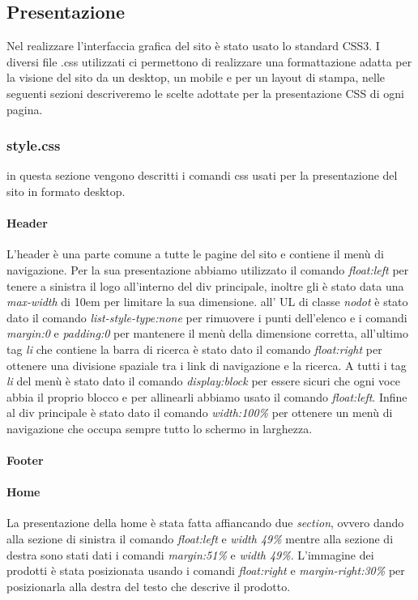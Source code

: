 \subsection{Presentazione}
Nel realizzare l'interfaccia grafica del sito è stato usato lo standard CSS3.\newline
I diversi file .css utilizzati ci permettono di realizzare una formattazione adatta per la visione del sito da un desktop, un mobile e per un layout di stampa, nelle seguenti sezioni descriveremo le scelte adottate per la presentazione CSS di ogni pagina.

\subsubsection{style.css}
in questa sezione vengono descritti i comandi css usati per la presentazione del sito in formato desktop.

\paragraph{Header} \mbox{}
L'header è una parte comune a tutte le pagine del sito e contiene il menù di navigazione. \newline Per la sua presentazione abbiamo utilizzato il comando \emph{float:left} per tenere a sinistra il logo all'interno del div principale, inoltre gli è stato data una \emph{max-width} di 10em per limitare la sua dimensione. all' UL di classe \emph{nodot} è stato dato il comando \emph{list-style-type:none} per rimuovere i punti dell'elenco e i comandi \emph{margin:0} e \emph{padding:0} per mantenere il menù della dimensione corretta, all'ultimo tag \emph{li} che contiene la barra di ricerca è stato dato il comando \emph{float:right} per ottenere una divisione spaziale tra i link di navigazione e la ricerca.
A tutti i tag \emph{li} del menù è stato dato il comando \emph{display:block} per essere sicuri che ogni voce abbia il proprio blocco e per allinearli abbiamo usato il comando \emph{float:left}.
Infine al div principale è stato dato il comando \emph{width:100\%} per ottenere un menù di navigazione che occupa sempre tutto lo schermo in larghezza.

\paragraph{Footer} \mbox{}



\paragraph{Home} \mbox{}
La presentazione della home è stata fatta affiancando due \emph{section}, ovvero dando alla sezione di sinistra il comando \emph{float:left} e \emph{width 49\%} mentre alla sezione di destra sono stati dati i comandi \emph{margin:51\%} e \emph{width 49\%}. 
L'immagine dei prodotti è stata posizionata usando i comandi \emph{float:right} e \emph{margin-right:30\%} per posizionarla alla destra del testo che descrive il prodotto.

